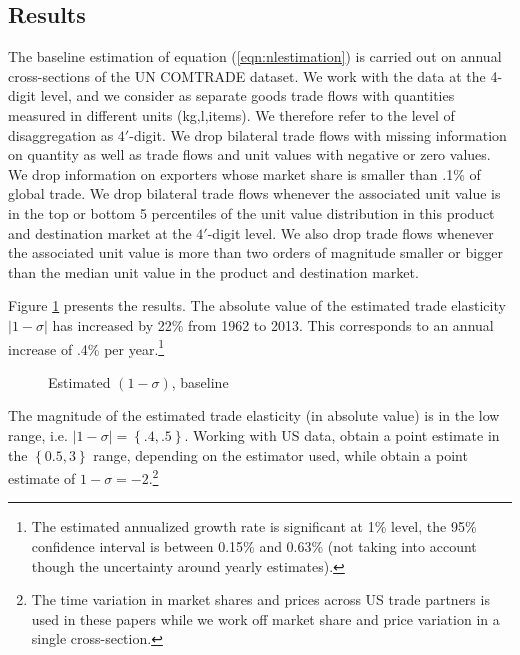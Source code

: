 \documentclass[12pt,twoside,a4paper,notitlepage]{article}
\begin{document}
\subsection{Results}\label{subsec:baseline}

The baseline estimation of equation (\ref{eqn:nlestimation}) is carried out on annual cross-sections of the UN COMTRADE dataset.
We work with the data at the 4-digit level, and we consider as separate goods trade flows with quantities measured in different units (kg,l,items). 
We therefore refer to the level of disaggregation as $4'$-digit.
We drop bilateral trade flows with missing information on quantity as well as trade flows and unit values with negative or zero values.
We drop information on exporters whose market share is smaller than .1\% of global trade. 
We drop bilateral trade flows whenever the associated unit value is in the top or bottom 5 percentiles of the unit value distribution in this product and destination market at the $4'$-digit level.
We also drop trade flows whenever the associated unit value is more than two orders of magnitude smaller or bigger than the median unit value in the product and destination market.

Figure \ref{fig:baseline} presents the results.
The absolute value of the estimated trade elasticity $|1-\sigma|$ has increased by 22\% from 1962 to 2013.
This corresponds to an annual increase of .4\% per year.\footnote{The estimated annualized growth rate is significant at 1\% level, the 95\% confidence interval is between 0.15\% and 0.63\% (not taking into account though the uncertainty around yearly estimates).}

\begin{figure}[H]
\caption{Estimated $(1-\sigma)$, baseline\label{fig:baseline}}
\begin{center}
\setlength{\fboxrule}{1pt} %
\setlength{\fboxsep}{.1in} %
\end{center}
\end{figure}

The magnitude of the estimated trade elasticity (in absolute value) is in the low range, i.e. $|1-\sigma|=\left\{.4,.5\right\}$. Working with US data, \cite{Feenstra2018} obtain a point estimate in the $\left\{0.5,3\right\}$ range, depending on the estimator used, while \cite{Imbs2015} obtain a point estimate of $1-\sigma=-2$.\footnote{The time variation in market shares and prices across US trade partners is used in these papers while we work off market share and price variation in a single cross-section.}
\end{document}
